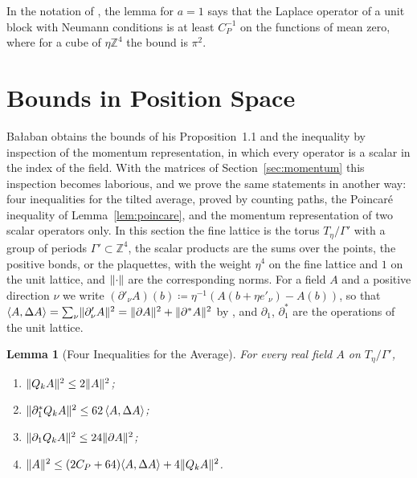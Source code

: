 \documentclass[11pt]{preprint}
\DeclarePairedDelimiter{\norm}{\lVert}{\rVert}
\numberwithin{equation}{section}
\newtheorem{lemma}[theorem]{Lemma}
\theoremstyle{definition}
\theoremstyle{remark}
\theoremstyle{plain}
\begin{document}
In the notation of \cite[(2.27)]{BalabanRDG}, the lemma for $a = 1$ says that the Laplace operator of a unit block with Neumann conditions is at least $C_P^{-1}$ on the functions of mean zero, where for a cube of $\eta\mathbb Z^4$ the bound is $\pi^2$.

\section{Bounds in Position Space}\label{sec:position-space}

Ba{\l}aban obtains the bounds of his Proposition~1.1 and the inequality \cite[(1.67)]{BalabanPRT1} by inspection of the momentum representation, in which every operator is a scalar in the index of the field. With the matrices of Section~\ref{sec:momentum} this inspection becomes laborious, and we prove the same statements in another way: four inequalities for the tilted average, proved by counting paths, the Poincar\'e inequality of Lemma~\ref{lem:poincare}, and the momentum representation of two scalar operators only. In this section the fine lattice is the torus $T_\eta/\Gamma'$ with a group of periods $\Gamma' \subset \mathbb Z^4$, the scalar products are the sums over the points, the positive bonds, or the plaquettes, with the weight $\eta^4$ on the fine lattice and $1$ on the unit lattice, and $\norm{\cdot}$ are the corresponding norms. For a field $A$ and a positive direction $\nu$ we write $(\partial'_\nu A)(b) \coloneqq \eta^{-1}(A(b + \eta e'_\nu) - A(b))$, so that $\langle A, \Delta A\rangle = \sum_\nu\norm{\partial'_\nu A}^2 = \norm{\partial A}^2 + \norm{\partial^*A}^2$ by \cite[(1.21)]{BalabanPRT1}, and $\partial_1$, $\partial_1^*$ are the operations of the unit lattice.

\begin{lemma}[Four Inequalities for the Average]\label{lem:four-inequalities}
For every real field $A$ on $T_\eta/\Gamma'$,
\begin{enumerate}[label=(\roman*)]
\item $\norm{Q_kA}^2 \leq 2\norm{A}^2$;
\item $\norm{\partial_1^*Q_kA}^2 \leq 62\,\langle A, \Delta A\rangle$;
\item $\norm{\partial_1Q_kA}^2 \leq 24\norm{\partial A}^2$;
\item $\norm{A}^2 \leq (2C_P + 64)\langle A, \Delta A\rangle + 4\norm{Q_kA}^2$.
\end{enumerate}
\end{lemma}
\end{document}
